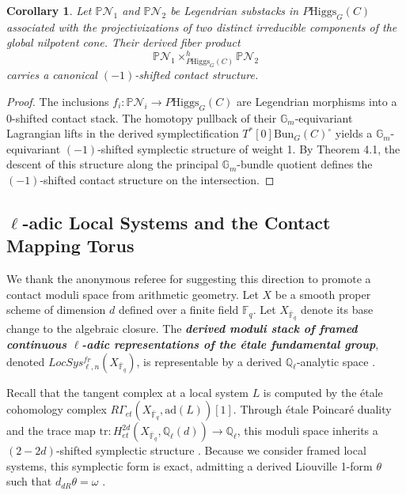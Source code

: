 \documentclass[reqno]{amsart}
\newtheorem{corollary}[theorem]{Corollary}
\theoremstyle{definition}
\theoremstyle{remark}
\newcommand{\Gm}{\mathbb{G}_m}
\newcommand{\bfem}[1]{\textbf{\textit{#1}}}
\begin{document}
{\begin{corollary} \label{cor:nilpotent_intersection}
Let $\mathbb{P}\mathcal{N}_1$ and $\mathbb{P}\mathcal{N}_2$ be Legendrian substacks in $P\mathrm{Higgs}_G(C)$ associated with the projectivizations of two distinct irreducible components of the global nilpotent cone. Their derived fiber product
\[
    \mathbb{P}\mathcal{N}_1 \times_{P\mathrm{Higgs}_G(C)}^h \mathbb{P}\mathcal{N}_2
\]
carries a canonical $(-1)$-shifted contact structure.
\end{corollary}

\begin{proof}
The inclusions $f_i \colon \mathbb{P}\mathcal{N}_i \to P\mathrm{Higgs}_G(C)$ are Legendrian morphisms into a $0$-shifted contact stack. The homotopy pullback of their $\Gm$-equivariant Lagrangian lifts in the derived symplectification $T^*[0]\mathrm{Bun}_G(C)^\circ$ yields a $\Gm$-equivariant $(-1)$-shifted symplectic structure of weight 1. By Theorem 4.1, the descent of this structure along the principal $\Gm$-bundle quotient defines the $(-1)$-shifted contact structure on the intersection.
\end{proof}

\subsection{\texorpdfstring{$\ell$}{l}-adic Local Systems and the Contact Mapping Torus}

We thank the anonymous referee for suggesting this direction to promote a contact moduli space from arithmetic geometry.
Let $X$ be a smooth proper scheme of dimension $d$ defined over a finite field $\mathbb{F}_q$. Let $X_{\bar{\mathbb{F}}_q}$ denote its base change to the algebraic closure. The \bfem{derived moduli stack of framed continuous $\ell$-adic representations of the \'{e}tale fundamental group}, denoted $LocSys_{\ell,n}^{fr}(X_{\bar{\mathbb{F}}_q})$, is representable by a derived $\mathbb{Q}_\ell$-analytic space \cite[Theorem 1.1]{Antonio}. 

Recall that the tangent complex at a local system $L$ is computed by the \'{e}tale cohomology complex $R\Gamma_{et}(X_{\bar{\mathbb{F}}_q}, \mathrm{ad}(L))[1]$. Through \'{e}tale Poincar\'{e} duality and the trace map $\mathrm{tr} \colon H^{2d}_{et}(X_{\bar{\mathbb{F}}_q}, \mathbb{Q}_\ell(d)) \to \mathbb{Q}_\ell$, this moduli space inherits a $(2-2d)$-shifted symplectic structure \cite[Section 5]{Antonio}. Because we consider framed local systems, this symplectic form is exact, admitting a derived Liouville 1-form $\theta$ such that $d_{dR}\theta = \omega$ \cite[Section 2]{Calaque}.

}
\end{document}

